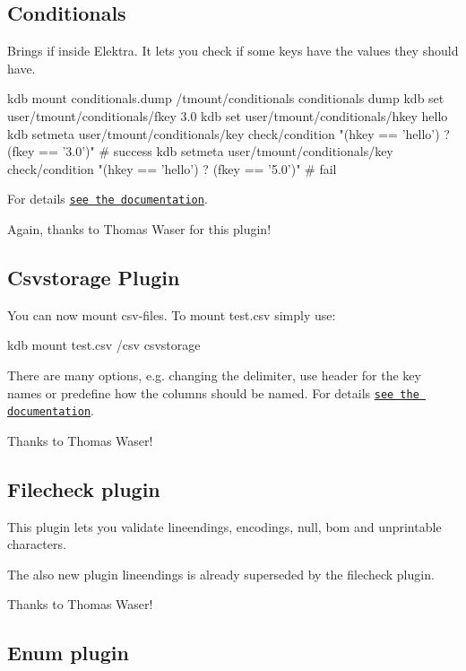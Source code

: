 \subsection*{Conditionals}

Brings {\ttfamily if} inside Elektra. It lets you check if some keys have the values they should have.


\begin{DoxyCode}
kdb mount conditionals.dump /tmount/conditionals conditionals dump
kdb set user/tmount/conditionals/fkey 3.0
kdb set user/tmount/conditionals/hkey hello
kdb setmeta user/tmount/conditionals/key check/condition "(hkey == 'hello') ? (fkey == '3.0')" # success
kdb setmeta user/tmount/conditionals/key check/condition "(hkey == 'hello') ? (fkey == '5.0')" # fail
\end{DoxyCode}


For details \href{https://master.libelektra.org/src/plugins/conditionals/}{\tt see the documentation}.

Again, thanks to Thomas Waser for this plugin!

\subsection*{Csvstorage Plugin}

You can now mount csv-\/files. To mount {\ttfamily test.\+csv} simply use\+:


\begin{DoxyCode}
kdb mount test.csv /csv csvstorage
\end{DoxyCode}


There are many options, e.\+g. changing the delimiter, use header for the key names or predefine how the columns should be named. For details \href{https://master.libelektra.org/src/plugins/csvstorage/}{\tt see the documentation}.

Thanks to Thomas Waser!

\subsection*{Filecheck plugin}

This plugin lets you validate lineendings, encodings, null, bom and unprintable characters.

The also new plugin lineendings is already superseded by the filecheck plugin.

Thanks to Thomas Waser!

\subsection*{Enum plugin}

